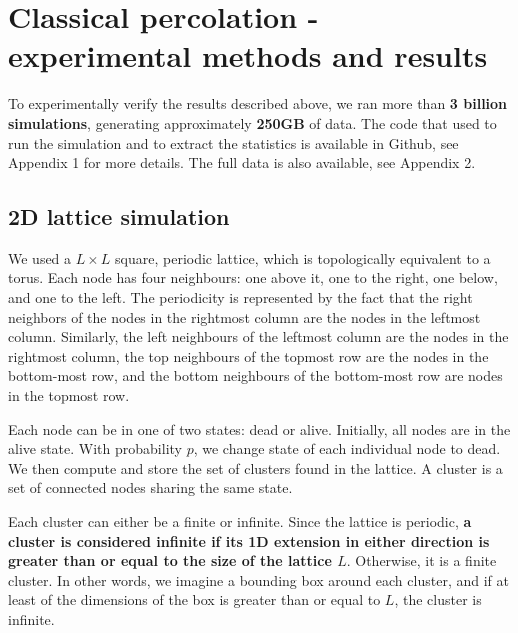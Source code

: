\chapter{Classical percolation - experimental methods and results} 
\label{ch:classical_experimental}




To experimentally verify the results described above, we ran more than \textbf{3 billion simulations}, generating approximately \textbf{250GB} of data. The code that used to run the simulation and to extract the statistics is available in Github, see Appendix 1 for more details. The full data is also available, see Appendix 2. 


\section{2D lattice simulation}
\label{sec:2d_lattice_simulation}


We used a $L \times L$ square, periodic lattice, which is topologically equivalent to a torus. Each node has four neighbours: one above it, one to the right, one below, and one to the left. The periodicity is represented by the fact that the right neighbors of the nodes in the rightmost column are the nodes in the leftmost column. Similarly, the left neighbours of the leftmost column are the nodes in the rightmost column, the top neighbours of the topmost row are the nodes in the bottom-most row, and the bottom neighbours of the bottom-most row are nodes in the topmost row.

Each node can be in one of two states: dead or alive. Initially, all nodes are in the alive state. With probability $p$, we change state of each individual node to dead. We then compute and store the set of clusters found in the lattice. A cluster is a set of connected nodes sharing the same state. 

Each cluster can either be a finite or infinite. Since the lattice is periodic, \textbf{a cluster is considered infinite if its 1D extension in either direction is greater than or equal to the size of the lattice $L$}. Otherwise, it is a finite cluster. In other words, we imagine a bounding box around each cluster, and if at least of the dimensions of the box is greater than or equal to $L$, the cluster is infinite. 

